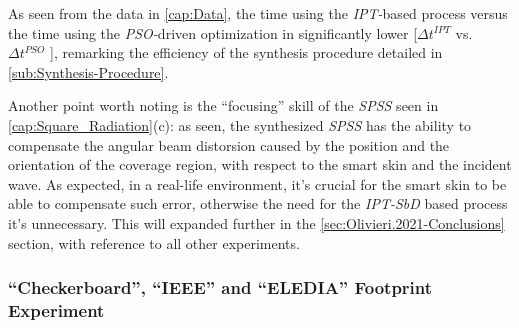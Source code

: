 As seen from the data in \ref{cap:Data}, the time using the \emph{IPT-}based
process versus the time using the \emph{PSO-}driven optimization in
significantly lower {[}$\Delta t^{IPT}$ vs. $\Delta t^{PSO}$ {]},
remarking the efficiency of the synthesis procedure detailed in \ref{sub:Synthesis-Procedure}.

Another point worth noting is the {}``focusing'' skill of the \emph{SPSS}
seen in \ref{cap:Square_Radiation}(c): as seen, the synthesized \emph{SPSS}
has the ability to compensate the angular beam distorsion caused by
the position and the orientation of the coverage region, with respect
to the smart skin and the incident wave. As expected, in a real-life
environment, it's crucial for the smart skin to be able to compensate
such error, otherwise the need for the \emph{IPT-SbD} based process
it's unnecessary. This will expanded further in the \ref{sec:Olivieri.2021-Conclusions}
section, with reference to all other experiments.


\subsubsection{{}``Checkerboard'', {}``IEEE'' and {}``ELEDIA'' Footprint Experiment}

